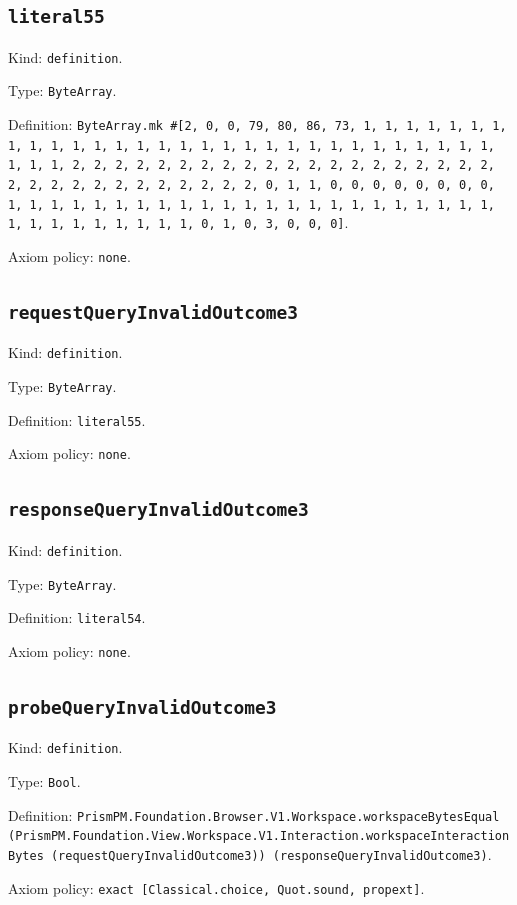 \documentclass[11pt]{article}
\begin{document}
\subsection*{\texttt{literal55}}
\noindent Kind: \texttt{definition}.\par
\noindent Type: \texttt{ByteArray}.\par
\noindent Definition: \texttt{ByteArray.mk \#[2, 0, 0, 79, 80, 86, 73, 1, 1, 1, 1, 1, 1, 1, 1, 1, 1, 1, 1, 1, 1, 1, 1, 1, 1, 1, 1, 1, 1, 1, 1, 1, 1, 1, 1, 1, 1, 1, 1, 1, 2, 2, 2, 2, 2, 2, 2, 2, 2, 2, 2, 2, 2, 2, 2, 2, 2, 2, 2, 2, 2, 2, 2, 2, 2, 2, 2, 2, 2, 2, 2, 2, 0, 1, 1, 0, 0, 0, 0, 0, 0, 0, 0, 1, 1, 1, 1, 1, 1, 1, 1, 1, 1, 1, 1, 1, 1, 1, 1, 1, 1, 1, 1, 1, 1, 1, 1, 1, 1, 1, 1, 1, 1, 1, 1, 0, 1, 0, 3, 0, 0, 0]}.\par
\noindent Axiom policy: \texttt{none}.\par
\subsection*{\texttt{requestQueryInvalidOutcome3}}
\noindent Kind: \texttt{definition}.\par
\noindent Type: \texttt{ByteArray}.\par
\noindent Definition: \texttt{literal55}.\par
\noindent Axiom policy: \texttt{none}.\par
\subsection*{\texttt{responseQueryInvalidOutcome3}}
\noindent Kind: \texttt{definition}.\par
\noindent Type: \texttt{ByteArray}.\par
\noindent Definition: \texttt{literal54}.\par
\noindent Axiom policy: \texttt{none}.\par
\subsection*{\texttt{probeQueryInvalidOutcome3}}
\noindent Kind: \texttt{definition}.\par
\noindent Type: \texttt{Bool}.\par
\noindent Definition: \texttt{PrismPM.Foundation.Browser.V1.Workspace.workspaceBytesEqual (PrismPM.Foundation.View.Workspace.V1.Interaction.workspaceInteractionBytes (requestQueryInvalidOutcome3)) (responseQueryInvalidOutcome3)}.\par
\noindent Axiom policy: \texttt{exact [Classical.choice, Quot.sound, propext]}.\par
\end{document}
